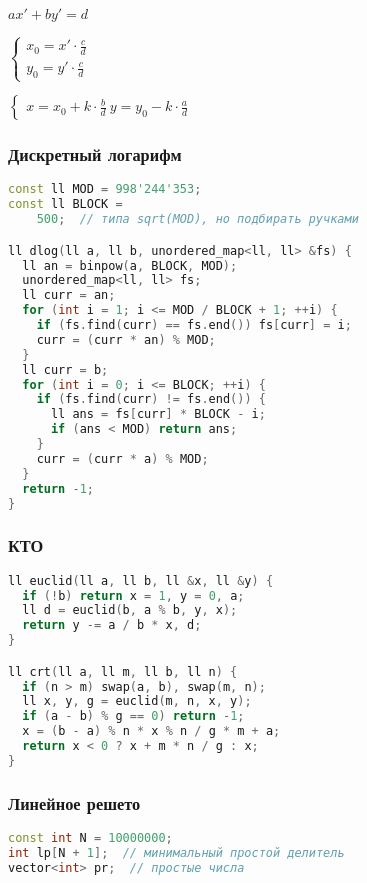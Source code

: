 \documentclass[10pt,a4paper,landscape,twosided]{extarticle}
\begin{document}
\begin{multicols}{3}
$ax '+by' = d$

$\begin{cases}x_{0} = x '\cdot\frac{c}{d}\\ y_{0}=y'\cdot\frac{c}{ d }\end{ cases }$

$\begin{cases}x = x_{0} + k\cdot\frac{b}{ d }\ y = y_{0} - k\cdot\frac{a}{ d }\end
{ cases }$

\subsubsection{Дискретный логарифм}
\begin{lstlisting}[language=C++]
const ll MOD = 998'244'353;
const ll BLOCK =
    500;  // типа sqrt(MOD), но подбирать ручками

ll dlog(ll a, ll b, unordered_map<ll, ll> &fs) {
  ll an = binpow(a, BLOCK, MOD);
  unordered_map<ll, ll> fs;
  ll curr = an;
  for (int i = 1; i <= MOD / BLOCK + 1; ++i) {
    if (fs.find(curr) == fs.end()) fs[curr] = i;
    curr = (curr * an) % MOD;
  }
  ll curr = b;
  for (int i = 0; i <= BLOCK; ++i) {
    if (fs.find(curr) != fs.end()) {
      ll ans = fs[curr] * BLOCK - i;
      if (ans < MOD) return ans;
    }
    curr = (curr * a) % MOD;
  }
  return -1;
}
\end{lstlisting}

\subsubsection{КТО}
\begin{lstlisting}[language=C++]
ll euclid(ll a, ll b, ll &x, ll &y) {
  if (!b) return x = 1, y = 0, a;
  ll d = euclid(b, a % b, y, x);
  return y -= a / b * x, d;
}

ll crt(ll a, ll m, ll b, ll n) {
  if (n > m) swap(a, b), swap(m, n);
  ll x, y, g = euclid(m, n, x, y);
  if (a - b) % g == 0) return -1;
  x = (b - a) % n * x % n / g * m + a;
  return x < 0 ? x + m * n / g : x;
}\end{lstlisting}

\subsubsection{Линейное решето}
\begin{lstlisting}[language=C++]
const int N = 10000000;
int lp[N + 1];  // минимальный простой делитель
vector<int> pr;  // простые числа


\end{lstlisting}
\end{multicols}
\end{document}
